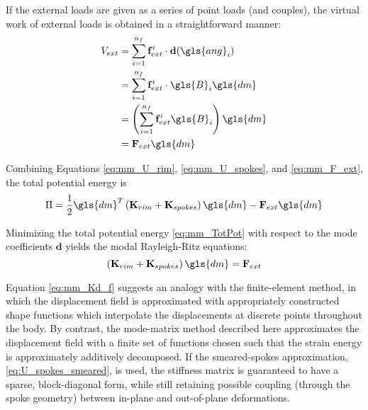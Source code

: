 \documentclass[\rootdir/thesis.tex]{subfiles}
\begin{document}
If the external loads are given as a series of point loads (and couples), the virtual work of external loads is obtained in a straightforward manner:
\begin{align}
\label{eq:mm_F_ext}
\begin{split}
V_{ext} &= \sum_{i=1}^{n_f} \mathbf{f}_{ext}^i \cdot \mathbf{d}(\gls{ang}_i) \\
&= \sum_{i=1}^{n_f} \mathbf{f}_{ext}^i \cdot \gls{B}_i \gls{dm}\\
&= \left(\sum_{i=1}^{n_f} \mathbf{f}_{ext}^i \gls{B}_i \right) \gls{dm}\\
&= \mathbf{F}_{ext}\gls{dm}
\end{split}
\end{align}

Combining Equations \eqref{eq:mm_U_rim}, \eqref{eq:mm_U_spokes}, and \eqref{eq:mm_F_ext}, the total potential energy is
\begin{equation}
\label{eq:mm_TotPot}
\Pi = \frac{1}{2} \gls{dm}^T \left( \mathbf{K}_{rim} + \mathbf{K}_{spokes} \right) \gls{dm} - \mathbf{F}_{ext}\gls{dm}
\end{equation}

Minimizing the total potential energy \eqref{eq:mm_TotPot} with respect to the mode coefficients $\mathbf{d}$ yields the modal Rayleigh-Ritz equations:
\begin{equation}
\label{eq:mm_Kd_f}
\left( \mathbf{K}_{rim} + \mathbf{K}_{spokes} \right) \gls{dm} = \mathbf{F}_{ext}
\end{equation}

Equation \eqref{eq:mm_Kd_f} suggests an analogy with the finite-element method, in which the displacement field is approximated with appropriately constructed shape functions which interpolate the displacements at discrete points throughout the body. By contrast, the mode-matrix method described here approximates the displacement field with a finite set of functions chosen such that the strain energy is approximately additively decomposed. If the smeared-spokes approximation, \eqref{eq:U_spokes_smeared}, is used, the stiffness matrix is guaranteed to have a sparse, block-diagonal form, while still retaining possible coupling (through the spoke geometry) between in-plane and out-of-plane deformations.
\end{document}
